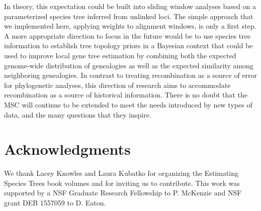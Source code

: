 \documentclass[11pt]{article}
\begin{document}
In theory, this expectation could be built into sliding window analyses based on a parameterized species tree inferred from unlinked loci. The simple approach that we implemented here, applying weights to alignment windows, is only a first step. A more appropriate direction to focus in the future would be to use species tree information to establish tree topology priors in a Bayesian context that could be used to improve local gene tree estimation by combining both the expected genome-wide distribution of genealogies as well as the expected similarity among neighboring genealogies. In contrast to treating recombination as a source of error for phylogenetic analyses, this direction of research aims to accommodate recombination as a source of historical information. There is no doubt that the MSC will continue to be extended to meet the needs introduced by new types of data, and the many questions that they inspire. 






\section*{Acknowledgments}
We thank Lacey Knowles and Laura Kubatko for organizing the Estimating Species Trees book volumes and for inviting us to contribute. This work was supported by a NSF Graduate Research Fellowship to P. McKenzie and NSF grant DEB 1557059 to D. Eaton.
\end{document}

